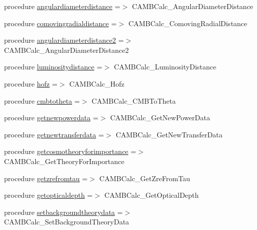 \begin{DoxyCompactItemize}
\item 
procedure \mbox{\hyperlink{structcalculator__camb_1_1camb__calculator_a1523ae13a614c851c89b155b4b40c901}{angulardiameterdistance}} =$>$ C\+A\+M\+B\+Calc\+\_\+\+Angular\+Diameter\+Distance
\item 
procedure \mbox{\hyperlink{structcalculator__camb_1_1camb__calculator_adcd99173b91d84f212e7a6ad6e82d2d9}{comovingradialdistance}} =$>$ C\+A\+M\+B\+Calc\+\_\+\+Comoving\+Radial\+Distance
\item 
procedure \mbox{\hyperlink{structcalculator__camb_1_1camb__calculator_a243e10e2135974d4631d2a42155da8ed}{angulardiameterdistance2}} =$>$ C\+A\+M\+B\+Calc\+\_\+\+Angular\+Diameter\+Distance2
\item 
procedure \mbox{\hyperlink{structcalculator__camb_1_1camb__calculator_acf3f07f78987ef1814fbe55288b52f12}{luminositydistance}} =$>$ C\+A\+M\+B\+Calc\+\_\+\+Luminosity\+Distance
\item 
procedure \mbox{\hyperlink{structcalculator__camb_1_1camb__calculator_ab53093081529d5a467c31d65bcb69c38}{hofz}} =$>$ C\+A\+M\+B\+Calc\+\_\+\+Hofz
\item 
procedure \mbox{\hyperlink{structcalculator__camb_1_1camb__calculator_a895b226c32aa349e8aa81ab2d13a4a77}{cmbtotheta}} =$>$ C\+A\+M\+B\+Calc\+\_\+\+C\+M\+B\+To\+Theta
\item 
procedure \mbox{\hyperlink{structcalculator__camb_1_1camb__calculator_a0e78ba6fe885d3839407d0481c0ed5eb}{getnewpowerdata}} =$>$ C\+A\+M\+B\+Calc\+\_\+\+Get\+New\+Power\+Data
\item 
procedure \mbox{\hyperlink{structcalculator__camb_1_1camb__calculator_ae05a2f1ae02af9266dfc3c73e1770787}{getnewtransferdata}} =$>$ C\+A\+M\+B\+Calc\+\_\+\+Get\+New\+Transfer\+Data
\item 
procedure \mbox{\hyperlink{structcalculator__camb_1_1camb__calculator_aba4904829c9b664ae654afc1caeb468d}{getcosmotheoryforimportance}} =$>$ C\+A\+M\+B\+Calc\+\_\+\+Get\+Theory\+For\+Importance
\item 
procedure \mbox{\hyperlink{structcalculator__camb_1_1camb__calculator_a1bf6bde63d6f2576b99025bda9889dac}{getzrefromtau}} =$>$ C\+A\+M\+B\+Calc\+\_\+\+Get\+Zre\+From\+Tau
\item 
procedure \mbox{\hyperlink{structcalculator__camb_1_1camb__calculator_ae360b5573478da302e55a8637d7754ab}{getopticaldepth}} =$>$ C\+A\+M\+B\+Calc\+\_\+\+Get\+Optical\+Depth
\item 
procedure \mbox{\hyperlink{structcalculator__camb_1_1camb__calculator_a079881f28b75e2c5d1de20491b9f3c27}{setbackgroundtheorydata}} =$>$ C\+A\+M\+B\+Calc\+\_\+\+Set\+Background\+Theory\+Data

\end{DoxyCompactItemize}

